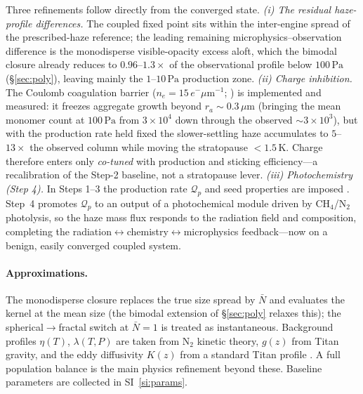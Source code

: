 \documentclass[11pt]{article}
\newcommand{\Nbar}{\bar{N}}
\newcommand{\Qprod}{\mathcal{Q}_p}
\begin{document}
Three refinements follow directly from the converged state.  \emph{(i) The
residual haze-profile differences.}  The coupled fixed point sits within the
inter-engine spread of the prescribed-haze reference; the leading remaining
microphysics--observation difference is the monodisperse visible-opacity excess
aloft, which the bimodal closure already reduces to $0.96$--$1.3\times$ of the
observational profile below $100\,\mathrm{Pa}$ (\S\ref{sec:poly}), leaving
mainly the $1$--$10\,\mathrm{Pa}$ production zone.  \emph{(ii) Charge inhibition.}  The Coulomb coagulation
barrier ($n_e=15\,e^-\mu\mathrm{m}^{-1}$; \citealp{deTrenquelleon2025}) is
implemented and measured: it freezes aggregate growth beyond
$r_a\sim0.3\,\mu$m (bringing the mean monomer count at $100\,\mathrm{Pa}$ from
$3\times10^4$ down through the observed $\sim\!3\times10^3$), but with the
production rate held fixed the slower-settling haze accumulates to $5$--$13\times$
the observed column while moving the stratopause $<1.5\,\mathrm{K}$.  Charge
therefore enters only \emph{co-tuned} with production and sticking
efficiency---a recalibration of the Step-2 baseline, not a stratopause lever.
\emph{(iii) Photochemistry (Step 4).}  In Steps 1--3 the production rate
$\Qprod$ and seed properties are imposed
\citep[$\Qprod=\SI{2.1e-13}{kg.m^{-2}.s^{-1}}$ at $z_0\approx415\,\mathrm{km}$;][]{deTrenquelleon2025}.
Step~4 promotes $\Qprod$ to an output of a photochemical module driven by
$\mathrm{CH_4}$/$\mathrm{N_2}$ photolysis, so the haze mass flux responds to the
radiation field and composition, completing the
radiation$\leftrightarrow$chemistry$\leftrightarrow$microphysics feedback---now
on a benign, easily converged coupled system.

\paragraph{Approximations.}
The monodisperse closure replaces the true size spread by $\Nbar$ and evaluates
the kernel at the mean size (the bimodal extension of \S\ref{sec:poly} relaxes
this); the spherical$\to$fractal switch at $\Nbar=1$ is treated as
instantaneous. Background profiles $\eta(T)$, $\lambda(T,P)$ are taken from
$\mathrm{N_2}$ kinetic theory, $g(z)$ from Titan gravity, and the eddy
diffusivity $K(z)$ from a standard Titan profile \citep{Vuitton2019}.  A full
population balance is the main physics refinement beyond these.  Baseline
parameters are collected in SI~\ref{si:params}.



\end{document}
